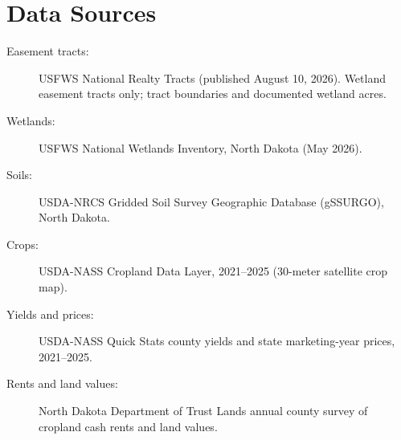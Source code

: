 \documentclass{theme/arpc-memo}
\begin{document}
\section{Data Sources}\label{app:data}

\begin{description}

\item[Easement tracts:] USFWS National Realty Tracts (published August 10, 2026). Wetland easement tracts only; tract boundaries and documented wetland acres.

\item[Wetlands:] USFWS National Wetlands Inventory, North Dakota (May 2026).

\item[Soils:] USDA-NRCS Gridded Soil Survey Geographic Database (gSSURGO), North Dakota.

\item[Crops:] USDA-NASS Cropland Data Layer, 2021--2025 (30-meter satellite crop map).

\item[Yields and prices:] USDA-NASS Quick Stats county yields and state marketing-year prices, 2021--2025.

\item[Rents and land values:] North Dakota Department of Trust Lands annual county survey of cropland cash rents and land values.

\end{description}






\end{document}
